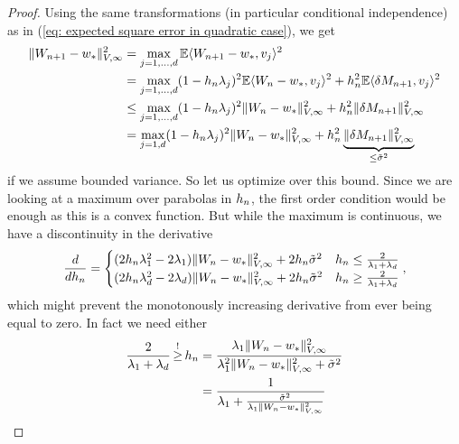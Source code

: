 \begin{proof}
	Using the same
	transformations (in particular conditional independence) as in (\ref{eq:
	expected square error in quadratic case}), we get
	\begin{align}
		\nonumber
		\|W_{n+1} -w_*\|_{V,\infty}^2
		&= \max_{j=1,\dots,d} \mathbb{E}\langle W_{n+1} -w_*, v_j\rangle^2\\
		\nonumber
		&= \max_{j=1,\dots,d} (1-h_n\lambda_j)^2\mathbb{E}\langle W_n -w_*, v_j\rangle^2
		+ h_n^2 \mathbb{E}\langle \delta M_{n+1}, v_j \rangle^2\\
		\nonumber
		&\le \max_{j=1,\dots,d} (1-h_n\lambda_j)^2\|W_n -w_*\|_{V,\infty}^2
		+ h_n^2 \|\delta M_{n+1}\|_{V,\infty}^2\\
		\label{eq: upper bound weird norm weight distance}
		&= \max_{j=1,d} (1-h_n\lambda_j)^2\|W_n -w_*\|_{V,\infty}^2
		+ h_n^2 \underbrace{\|\delta M_{n+1}\|_{V,\infty}^2}_{\le \tilde{\sigma}^2}
	\end{align}
	if we assume bounded variance. So let us optimize over this bound. Since
	we are looking at a maximum over parabolas in \(h_n\), the first order
	condition would be enough as this is a convex function. But while the maximum is
	continuous, we have a discontinuity in the derivative 
	\begin{align*}
		\frac{d}{dh_n}
		= \begin{cases}
		(2h_n \lambda_1^2 - 2\lambda_1)\|W_n-w_*\|_{V,\infty}^2
		+ 2 h_n \tilde{\sigma}^2
		& h_n \le \frac{2}{\lambda_1+\lambda_d}\\
		(2h_n \lambda_d^2 - 2\lambda_d)\|W_n-w_*\|_{V,\infty}^2
		+ 2 h_n \tilde{\sigma}^2
		& h_n \ge \frac{2}{\lambda_1+\lambda_d}
		\end{cases},
	\end{align*}
	which might prevent the monotonously increasing derivative from ever being equal
	to zero. In fact we need either
	\begin{align*}
		\frac{2}{\hesseEV_1+\hesseEV_\dimension} \xge{!} \lr_n
		&= \frac{
			\hesseEV_1 \|\Weights_n-\minimum\|_{V,\infty}^2
		}{
			\hesseEV_1^2 \|\Weights_n-\minimum\|_{V,\infty}^2 + \tilde{\stdBound}^2
		}\\
		&= \frac{1}{
			\hesseEV_1 + \frac{\tilde{\stdBound}^2}{
				\hesseEV_1\|\Weights_n-\minimum\|_{V,\infty}^2
			}
		}
	\end{align*}

\end{proof}

